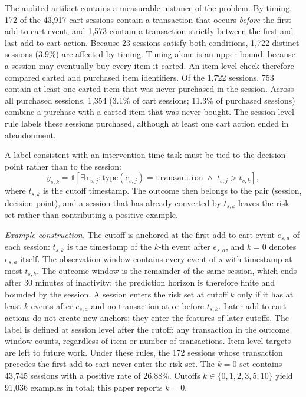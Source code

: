 \documentclass[conference, letterpaper]{IEEEtran}
\begin{document}
The audited artifact contains a measurable instance of the problem. By timing, 172 of the 43,917 cart sessions contain a transaction that occurs \emph{before} the first add-to-cart event, and 1,573 contain a transaction strictly between the first and last add-to-cart action. Because 23 sessions satisfy both conditions, 1,722 distinct sessions (3.9\%) are affected by timing. Timing alone is an upper bound, because a session may eventually buy every item it carted. An item-level check therefore compared carted and purchased item identifiers. Of the 1,722 sessions, 753 contain at least one carted item that was never purchased in the session. Across all purchased sessions, 1,354 (3.1\% of cart sessions; 11.3\% of purchased sessions) combine a purchase with a carted item that was never bought. The session-level rule labels these sessions purchased, although at least one cart action ended in abandonment.

A label consistent with an intervention-time task must be tied to the decision point rather than to the session:
\begin{equation}
y_{s,k} = \mathbb{1}[\exists\, e_{s,j} : \mathrm{type}(e_{s,j}) = \texttt{transaction} \;\wedge\; t_{s,j} > t_{s,k}],
\label{eq:cutlabel}
\end{equation}
where $t_{s,k}$ is the cutoff timestamp. The outcome then belongs to the pair (session, decision point), and a session that has already converted by $t_{s,k}$ leaves the risk set rather than contributing a positive example.

\emph{Example construction.} The cutoff is anchored at the first add-to-cart event $e_{s,a}$ of each session: $t_{s,k}$ is the timestamp of the $k$-th event after $e_{s,a}$, and $k=0$ denotes $e_{s,a}$ itself. The observation window contains every event of $s$ with timestamp at most $t_{s,k}$. The outcome window is the remainder of the same session, which ends after 30 minutes of inactivity; the prediction horizon is therefore finite and bounded by the session. A session enters the risk set at cutoff $k$ only if it has at least $k$ events after $e_{s,a}$ and no transaction at or before $t_{s,k}$. Later add-to-cart actions do not create new anchors; they enter the features of later cutoffs. The label is defined at session level after the cutoff: any transaction in the outcome window counts, regardless of item or number of transactions. Item-level targets are left to future work. Under these rules, the 172 sessions whose transaction precedes the first add-to-cart never enter the risk set. The $k=0$ set contains 43,745 sessions with a positive rate of 26.88\%. Cutoffs $k\in\{0,1,2,3,5,10\}$ yield 91,036 examples in total; this paper reports $k=0$.
\end{document}
